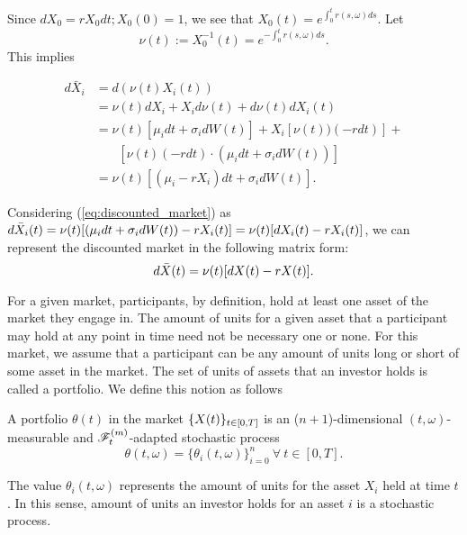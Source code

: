 \documentclass[../TGMAFFIRO.tex]{subfiles}
\begin{document}
\begin{remark}
	Since $dX_0 = r X_0 dt; X_0(0) = 1$, we see that $X_0(t) = e^{\int_0^tr(s,\omega) ds}$. Let
	\begin{equation}
		\nu(t) := X^{-1}_0(t) = e^{-\int_0^tr(s,\omega) ds}.
	\end{equation}
This implies

\begin{align}
	d\bar X_i &= d\left(\nu(t)X_i(t)\right) \nonumber \\
			&= \nu(t)dX_i + X_id\nu(t) + d\nu(t)dX_i(t)\nonumber\\
			&= \nu(t) [\mu_i dt + \sigma_i dW(t)] + X_i[\nu(t))(-r dt)] + \nonumber\\
			&\phantom{{}=1} [\nu(t)(-r dt)\cdot(\mu_i dt + \sigma_i dW(t))]\nonumber\\
			&=\nu(t)[(\mu_i - r X_i)dt + \sigma_i dW(t)] \label{eq:discounted_market}.
\end{align}

Considering (\ref{eq:discounted_market}) as $d\bar{X}_i(t) = \nu(t)[(\mu_i dt + \sigma_i dW(t)) - r X_i(t)] = \nu(t)[dX_i(t) - r X_i(t)]$, we can represent the discounted market in the following matrix form:
\begin{equation}
  d\bar{X}(t) = \nu(t)[dX(t) - r X(t)]. \label{eq:discounted_market_matrix}
\end{equation}

\end{remark}

For a given market, participants, by definition, hold at least one asset of the market they engage in. The amount of units for a given asset that a participant may hold at any point in time need not be necessary one or none. For this market, we assume that a participant can be any amount of units long or short of some asset in the market. The set of units of assets that an investor holds is called a portfolio. We define this notion as follows

\begin{definition}
	A portfolio $\theta(t)$ in the market $\{X(t)\}_{t\in[0,T]}$ is an ($n+1$)-dimensional $(t,\omega)$-measurable and $\mathscr{F}_t^{(m)}$-adapted stochastic process
	\begin{equation}
		\theta(t,\omega) = \{\theta_{i}(t,\omega)\}_{i=0}^{n} \ \forall \ t\in[0, T].
	\end{equation}
\end{definition}

The value $\theta_i(t,\omega)$ represents the amount of units for the asset $X_i$ held at time $t$. In this sense, amount of units an investor holds for an asset $i$ is a stochastic process.\\
\end{document}
